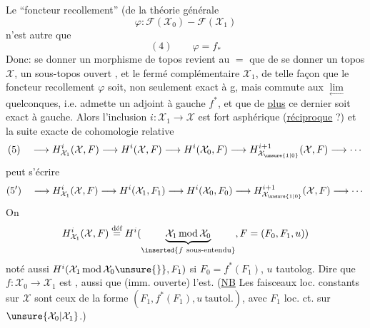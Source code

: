  Le ``foncteur recollement''  (de la théorie générale
\[
\varphi:\mathcal F(\mathcal X_0)\mathbin{-}\mathcal F(\mathcal X_1)
\]
n'est autre que
\[
(4)\qquad\varphi=f_*
\]
Donc: se donner un morphisme de topos  revient au $=$ que de se donner un topos $\mathcal X$,  un sous-topos ouvert , et le fermé complémentaire $\mathcal X_1$, de telle façon que le foncteur recollement $\varphi$ soit, non seulement exact à g, mais commute aux $\underset{\leftarrow}{\lim}$ quelconques,  i.e. admette un adjoint à gauche $f^*$, et que de \uline{plus} ce dernier soit exact à gauche. Alors l'inclusion $i:\mathcal X_1\longrightarrow\mathcal X$ est fort asphérique (\uline{réciproque} ?) et la suite exacte de cohomologie relative
\[
(5)\quad\longrightarrow H^i_{\mathcal X_1}(\mathcal X,F)\longrightarrow H^i(\mathcal X,F)\longrightarrow H^i(\mathcal X_0,F)\longrightarrow H^{i+1}_{\mathcal X_{\unsure{1|0}}}(\mathcal X,F)\longrightarrow\cdots
\]
peut s'écrire
\[
(5')\quad\longrightarrow H^i_{\mathcal X_1}(\mathcal X,F)\longrightarrow H^i(\mathcal X_1,F_1)\longrightarrow H^i(\mathcal X_0,F_0)\longrightarrow H^{i+1}_{\mathcal X_{\unsure{1|0}}}(\mathcal X,F)\longrightarrow\cdots
\]
On 
\[
H^i_{\mathcal X_1}(\mathcal X,F)\overset{\text{déf}}{=}H^i(\underbrace{\mathcal X_1\operatorname{mod}\mathcal X_0}_{\inserted{f\ \text{sous-entendu}}},F=(F_0,F_1,u))
\]
noté aussi  $H^i(\mathcal X_1\operatorname{mod}\mathcal X_0\unsure{\}},F_1)$ si $F_0=f^*(F_1)$, $u$ tautolog.
Dire que $f:\mathcal X_0\longrightarrow\mathcal X_1$ est ,  aussi que
(imm. ouverte) l'est. (\uline{NB} Les faisceaux loc. constants sur $\mathcal X$ sont ceux de la forme $(F_1,f^*(F_1),u\ \text{tautol.})$, avec $F_1$ loc. ct. sur $\unsure{\mathcal X_0|\mathcal X_1}$.)

